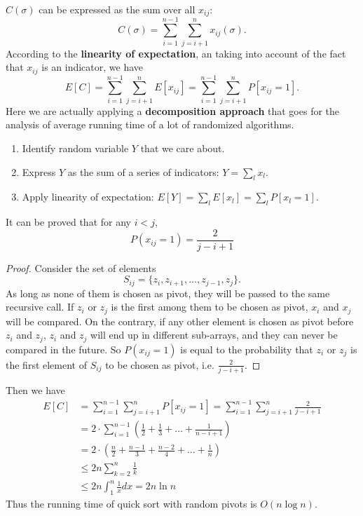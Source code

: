 $C(\sigma)$ can be expressed as the sum over all $x_{ij}$:
\begin{equation*}
C(\sigma)=\sum\limits_{i=1}^{n-1}\sum\limits_{j=i+1}^{n}x_{ij}(\sigma).
\end{equation*}
According to the \textbf{linearity of expectation}, an taking into account of the fact that $x_{ij}$ is an indicator, we have
\begin{equation*}
E[C]=\sum\limits_{i=1}^{n-1}\sum\limits_{j=i+1}^{n}E[x_{ij}]=\sum\limits_{i=1}^{n-1}\sum\limits_{j=i+1}^{n}P[x_{ij}=1].
\end{equation*}
Here we are actually applying a \textbf{decomposition approach} that goes for the analysis of average running time of a lot of randomized algorithms. 
\begin{enumerate}
\item Identify random variable $Y$ that we care about.
\item Express $Y$ as the sum of a series of indicators: $Y=\sum\limits_lx_l$.
\item Apply linearity of expectation: $E[Y]=\sum\limits_lE[x_l]=\sum\limits_lP[x_l=1]$.
\end{enumerate}
It can be proved that for any $i<j$,
$$P(x_{ij}=1)=\frac{2}{j-i+1}$$
\begin{proof}
Consider the set of elements 
$$S_{ij}=\{z_i,z_{i+1},\dots,z_{j-1},z_j\}.$$
As long as none of them is chosen as pivot, they will be passed to the same recursive call. If $z_i$ or $z_j$ is the first among them to be chosen as pivot, $x_i$ and $x_j$ will be compared. On the contrary, if any other element is chosen as pivot before $z_i$ and $z_j$, $z_i$ and $z_j$ will end up in different sub-arrays, and they can never be compared in the future. So $P(x_{ij}=1)$ is equal to the probability that $z_i$ or $z_j$ is the first element of $S_{ij}$ to be chosen as pivot, i.e. $\frac{2}{j-i+1}$.
\end{proof}
Then we have 
\begin{align*}
E[C]&=\sum\limits_{i=1}^{n-1}\sum\limits_{j=i+1}^{n}P[x_{ij}=1]=\sum\limits_{i=1}^{n-1}\sum\limits_{j=i+1}^{n}\frac{2}{j-i+1}\\
&=2\cdot\sum\limits_{i=1}^{n-1}\left(\frac{1}{2}+\frac{1}{3}+\dots+\frac{1}{n-i+1}\right)\\
&=2\cdot\left(\frac{n}{2}+\frac{n-1}{3}+\frac{n-2}{4}+\dots+\frac{1}{n}\right)\\
&\leq2n\sum\limits_{k=2}^n\frac{1}{k}\\
&\leq2n\int_1^n\frac{1}{x}dx=2n\ln n
\end{align*}
Thus the running time of quick sort with random pivots is $O(n\log n)$.
\ifx\PREAMBLE\undefined

\fi
